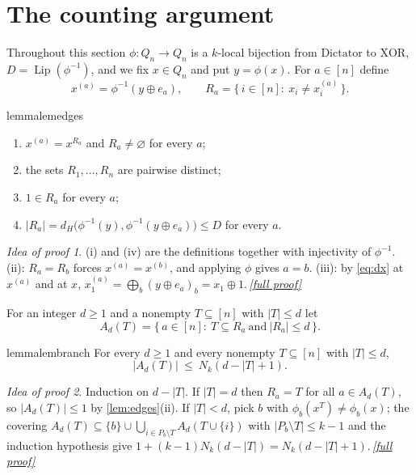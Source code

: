 \documentclass[11pt,a4paper]{article}
\theoremstyle{plain}
\theoremstyle{definition}
\theoremstyle{remark}
\newtheorem*{proofidea}{Idea of proof}
\newcommand{\fullproofref}[1]{\,\hyperref[#1]{\textit{[full proof]}}}
\newcommand{\dH}{d_H}
\newcommand{\Lip}{\operatorname{Lip}}
\newcommand{\Dict}{\mathrm{Dictator}}
\newcommand{\XOR}{\mathrm{XOR}}
\begin{document}
\section{The counting argument}\label{sec:count}

Throughout this section $\phi\colon Q_n\to Q_n$ is a $k$-local bijection from $\Dict$ to $\XOR$, $D=\Lip(\phi^{-1})$, and we fix $x\in Q_n$ and put $y=\phi(x)$. For $a\in[n]$ define
\begin{equation}\label{eq:Ra}
x^{(a)}=\phi^{-1}(y\oplus e_a),\qquad R_a=\{\,i\in[n]:\ x_i\ne x^{(a)}_i\,\}.
\end{equation}

\begin{restatable}{lemma}{lemedges}\label{lem:edges}
\begin{enumerate}[label=(\roman*),nosep]
\item $x^{(a)}=x^{R_a}$ and $R_a\ne\varnothing$ for every $a$;
\item the sets $R_1,\dots,R_n$ are pairwise distinct;
\item $1\in R_a$ for every $a$;
\item $|R_a|=\dH\bigl(\phi^{-1}(y),\phi^{-1}(y\oplus e_a)\bigr)\le D$ for every $a$.
\end{enumerate}
\end{restatable}
\begin{proofidea}
(i) and (iv) are the definitions together with injectivity of $\phi^{-1}$. (ii): $R_a=R_b$ forces $x^{(a)}=x^{(b)}$, and applying $\phi$ gives $a=b$. (iii): by \eqref{eq:dx} at $x^{(a)}$ and at $x$, $x^{(a)}_1=\bigoplus_b(y\oplus e_a)_b=x_1\oplus1$.\fullproofref{pf:edges}
\end{proofidea}

For an integer $d\ge1$ and a nonempty $T\subseteq[n]$ with $|T|\le d$ let
\begin{equation}\label{eq:A}
A_d(T)=\{\,a\in[n]:\ T\subseteq R_a\ \text{and}\ |R_a|\le d\,\}.
\end{equation}

\begin{restatable}{lemma}{lembranch}\label{lem:branch}
For every $d\ge1$ and every nonempty $T\subseteq[n]$ with $|T|\le d$,
\begin{equation}\label{eq:branch}
|A_d(T)|\ \le\ N_k(d-|T|+1).
\end{equation}
\end{restatable}
\begin{proofidea}
Induction on $d-|T|$. If $|T|=d$ then $R_a=T$ for all $a\in A_d(T)$, so $|A_d(T)|\le1$ by \cref{lem:edges}(ii). If $|T|<d$, pick $b$ with $\phi_b(x^T)\ne\phi_b(x)$; the covering $A_d(T)\subseteq\{b\}\cup\bigcup_{i\in P_b\setminus T}A_d(T\cup\{i\})$ with $|P_b\setminus T|\le k-1$ and the induction hypothesis give $1+(k-1)N_k(d-|T|)=N_k(d-|T|+1)$.\fullproofref{pf:branch}
\end{proofidea}
\end{document}
